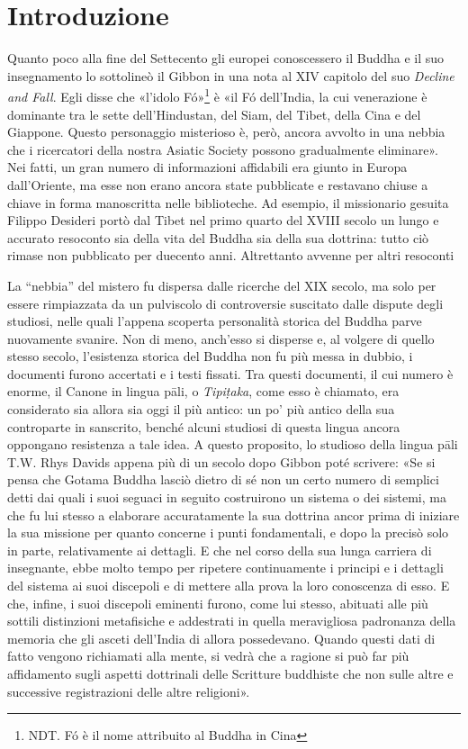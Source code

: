\chapter{Introduzione}

Quanto poco alla fine del Settecento gli europei conoscessero il Buddha
e il suo insegnamento lo sottolineò il Gibbon in una nota al XIV
capitolo del suo \emph{Decline and Fall}. Egli disse che «l’idolo
Fó»\footnote{NDT. Fó è il nome attribuito al Buddha in Cina}
è «il Fó dell’India, la cui venerazione è dominante
tra le sette dell’Hindustan, del Siam, del Tibet, della Cina e del
Giappone. Questo personaggio misterioso è, però, ancora avvolto in una
nebbia che i ricercatori della nostra Asiatic Society possono
gradualmente eliminare». Nei fatti, un gran numero di informazioni
affidabili era giunto in Europa dall’Oriente, ma esse non erano ancora
state pubblicate e restavano chiuse a chiave in forma manoscritta nelle
biblioteche. Ad esempio, il missionario gesuita Filippo Desideri portò
dal Tibet nel primo quarto del XVIII secolo un lungo e accurato
resoconto sia della vita del Buddha sia della sua dottrina: tutto ciò
rimase non pubblicato per duecento anni. Altrettanto avvenne per altri
resoconti

La “nebbia” del mistero fu dispersa dalle ricerche del XIX secolo, ma
solo per essere rimpiazzata da un pulviscolo di controversie suscitato
dalle dispute degli studiosi, nelle quali l’appena scoperta personalità
storica del Buddha parve nuovamente svanire. Non di meno, anch’esso si
disperse e, al volgere di quello stesso secolo, l’esistenza storica del
Buddha non fu più messa in dubbio, i documenti furono accertati e i
testi fissati. Tra questi documenti, il cui numero è enorme, il Canone
in lingua pāli, o \emph{Tipiṭaka}, come esso è chiamato, era considerato sia
allora sia oggi il più antico: un po’ più antico della sua controparte
in sanscrito, benché alcuni studiosi di questa lingua ancora oppongano
resistenza a tale idea. A questo proposito, lo studioso della lingua
pāli T.W. Rhys Davids appena più di un secolo dopo Gibbon poté scrivere:
«Se si pensa che Gotama Buddha lasciò dietro di sé non un certo numero
di semplici detti dai quali i suoi seguaci in seguito costruirono un
sistema o dei sistemi, ma che fu lui stesso a elaborare accuratamente la sua
dottrina ancor prima di iniziare la sua missione per quanto concerne i punti
fondamentali, e dopo la precisò solo in parte, relativamente ai dettagli. E che nel corso della
sua lunga carriera di insegnante, ebbe molto tempo per ripetere
continuamente i principi e i dettagli del sistema ai suoi discepoli e di
mettere alla prova la loro conoscenza di esso. E che, infine, i suoi
discepoli eminenti furono, come lui stesso, abituati alle più sottili
distinzioni metafisiche e addestrati in quella meravigliosa padronanza
della memoria che gli asceti dell’India di allora possedevano. Quando
questi dati di fatto vengono richiamati alla mente, si vedrà che a
ragione si può far più affidamento sugli aspetti dottrinali delle
Scritture buddhiste che non sulle altre e successive registrazioni delle
altre religioni».

